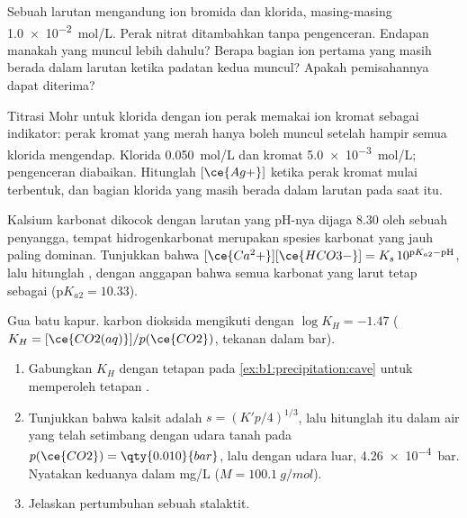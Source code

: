 \begin{exercise}[$\star\star$]\label{exo:b1:precipitation:7}
Sebuah larutan mengandung ion bromida dan klorida, masing-masing
\qty{1.0e-2}{mol/L}. Perak nitrat ditambahkan tanpa pengenceran. Endapan
manakah yang muncul lebih dahulu? Berapa bagian ion pertama yang masih
berada dalam larutan ketika padatan kedua muncul? Apakah pemisahannya
dapat diterima?
\end{exercise}

\begin{exercise}[$\star\star$]\label{exo:b1:precipitation:8}
Titrasi Mohr untuk klorida dengan ion perak memakai ion kromat sebagai
indikator: perak kromat yang merah hanya boleh muncul setelah hampir
semua klorida mengendap. Klorida \qty{0.050}{mol/L} dan kromat
\qty{5.0e-3}{mol/L}; pengenceran diabaikan. Hitunglah $[\ce{Ag+}]$ ketika
perak kromat mulai terbentuk, dan bagian klorida yang masih berada dalam
larutan pada saat itu.
\end{exercise}

\begin{exercise}[$\star\star$]\label{exo:b1:precipitation:9}
Kalsium karbonat dikocok dengan larutan yang pH-nya dijaga 8.30 oleh
sebuah penyangga, tempat hidrogenkarbonat merupakan spesies karbonat
yang jauh paling dominan. Tunjukkan bahwa
$[\ce{Ca^2+}][\ce{HCO3-}] = K_s\,10^{\mathrm{p}K_{a2} - \mathrm{pH}}$, lalu
hitunglah , dengan anggapan bahwa semua karbonat yang larut
tetap sebagai  ($\mathrm{p}K_{a2} = 10.33$).
\end{exercise}

\begin{exercise}[$\star\star\star$]\label{exo:b1:precipitation:10}
Gua batu kapur.  karbon dioksida mengikuti
 dengan $\log K_H = -1.47$ ($K_H =
[\ce{CO2(aq)}]/p(\ce{CO2})$, tekanan dalam bar).
\begin{enumerate}
  \item Gabungkan $K_H$ dengan tetapan pada
        \cref{ex:b1:precipitation:cave} untuk memperoleh tetapan
        .
  \item Tunjukkan bahwa  kalsit adalah $s = (K'p/4)^{1/3}$, lalu
        hitunglah  itu dalam air yang telah setimbang dengan
        udara tanah pada $p(\ce{CO2}) = \qty{0.010}{bar}$, lalu dengan
        udara luar, \qty{4.26e-4}{bar}. Nyatakan keduanya dalam
        \unit{mg/L}  ($M = \qty{100.1}{g/mol}$).
  \item Jelaskan pertumbuhan sebuah stalaktit.
\end{enumerate}
\end{exercise}

